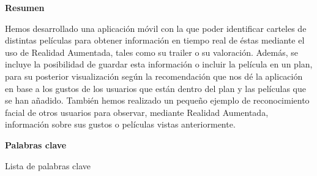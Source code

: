 
\newpage

\thispagestyle{empty}

\begin{center}

{\bf \Huge Resumen}

  \end{center}
\vspace{1cm}

Hemos desarrollado una aplicación móvil con la que poder identificar
carteles de distintas películas para obtener información en tiempo real de
éstas mediante el uso de Realidad Aumentada, tales como su trailer o su valoración. Además,
se incluye la posibilidad de guardar esta información o incluir la película en un plan, para 
su posterior visualización según la recomendación que nos dé la aplicación en base a 
los gustos de los usuarios que están dentro del plan y las películas que se han añadido. 
También hemos realizado un pequeño ejemplo de reconocimiento facial de otros usuarios para observar, 
mediante Realidad Aumentada, información sobre sus gustos o películas vistas anteriormente.

\vspace{1cm}


\begin{center}

{\bf \Large Palabras clave}

   \end{center}

   \vspace{0.5cm}
   
   Lista de palabras clave
   


